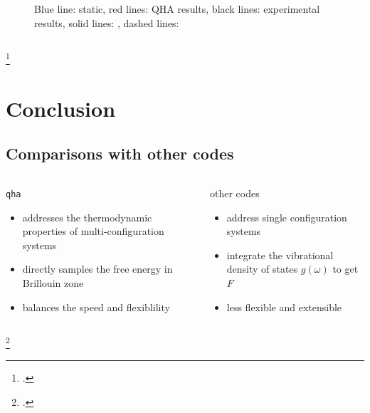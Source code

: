 \documentclass[13pt,aspectratio=169]{beamer}
\newcommand*{\RMN}[1]{\uppercase\expandafter{\romannumeral#1}}
\begin{document}
\begin{frame}{\subsecname{} \RMN{3}}
\begin{columns}
\begin{column}{0.5\textwidth}
\begin{figure}[t]
				\caption{\footnotemark Blue line: static, red lines: QHA results, black lines: experimental results,
					solid lines: , dashed lines: }
			\end{figure}
		\end{column}
	\end{columns}
	\footcitetext{umemoto2010order}
	\setcounter{footnote}{4}
\end{frame}

\section{Conclusion}

\subsection{Comparisons with other codes}
\begin{frame}{\subsecname}
	\begin{columns}
		\begin{column}{0.45\textwidth}
			\texttt{qha}\\
			\begin{itemize}[<+(1)->]
				\item addresses the thermodynamic properties of multi-configuration systems
				\item directly samples the free energy in Brillouin zone
				\item balances the speed and flexiblility
			\end{itemize}
		\end{column}

		\begin{column}{0.45\textwidth}
			other codes\\
			\begin{itemize}
				\item address single configuration systems
				\item integrate the vibrational density of states $g(\omega)$ to get $F$\footnotemark
				\item less flexible and extensible\footnotemark
			\end{itemize}
		\end{column}
	\end{columns}
	\setcounter{footnote}{5}
	\footcitetext{Petretto:2018gg}
\end{frame}
\end{document}

